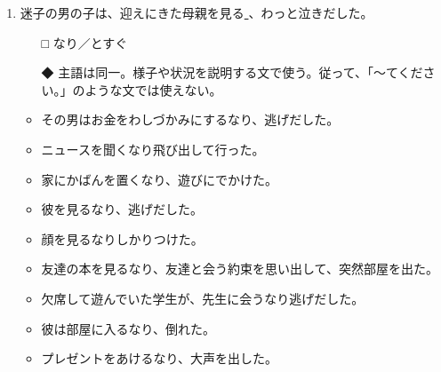 \documentclass[
uplatex,
b5paper,
10pt,
dvipdfmx
]{jsbook}
\begin{document}
\begin{enumerate}
\item 迷子の男の子は、迎えにきた母親を見る\underline{    }、わっと泣きだした。
\begin{itemize}
\item[□] なり／とすぐ
\item[◆] 主語は同一。様子や状況を説明する文で使う。従って、「〜てくださ
	  い。」のような文では使えない。
\end{itemize}
\begin{itemize}
\item その男はお金をわしづかみにするなり、逃げだした。
\item ニュースを聞くなり飛び出して行った。
\item 家にかばんを置くなり、遊びにでかけた。
\item 彼を見るなり、逃げだした。
\item 顔を見るなりしかりつけた。
\item 友達の本を見るなり、友達と会う約束を思い出して、突然部屋を出た。
\item 欠席して遊んでいた学生が、先生に会うなり逃げだした。
\item 彼は部屋に入るなり、倒れた。
\item プレゼントをあけるなり、大声を出した。
\end{itemize}
\end{enumerate}
\end{document}
